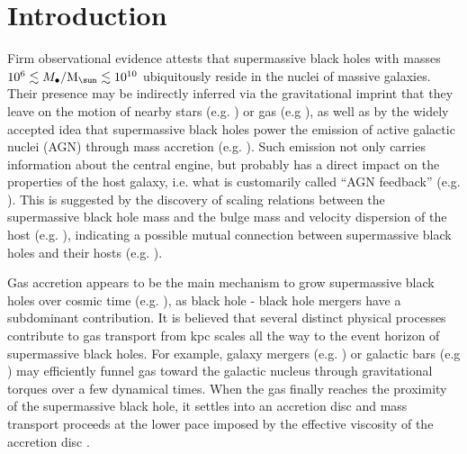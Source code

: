 \documentclass[a4paper,fleqn,usenatbib]{mnras}
\begin{document}

\section{Introduction}

Firm observational evidence attests that supermassive black holes with masses $10^{6} \lesssim M_{\bullet}/{\rm M}_{\sun} \lesssim 10^{10}$ ubiquitously reside in the nuclei of massive galaxies.
Their presence may be indirectly inferred via the gravitational imprint that they leave on the motion of nearby stars (e.g. \citealt{eckart+97,ferrarese+05,ghez+05,vandenbosch+10}) or gas (e.g \citealt{defrancesco+08,greene+10,kuo+11,vandenbosch+16}), as well as by the widely accepted idea that supermassive black holes power the emission of active galactic nuclei (AGN) through mass accretion (e.g. \citealt{lyndenbell+69,urry+95}).
Such emission not only carries information about the central engine, but probably has a direct impact on the properties of the host galaxy, i.e. what is customarily called ``AGN feedback'' (e.g. \citealt{springel+05b,sijacki+07,dubois+12,fabian+12}).
This is suggested by the discovery of scaling relations between the supermassive black hole mass and the bulge mass and velocity dispersion of the host (e.g. \citealt{ferrarese+00,tremaine+02,gultekin+09,kormendy+13,mcconnell+13}), indicating a possible mutual connection between supermassive black holes and their hosts (e.g. \citealt{silk+98,king+03,king+15,sijacki+15}).

Gas accretion appears to be the main mechanism to grow supermassive black holes over cosmic time (e.g. \citealt{soltan+82}), as black hole - black hole mergers have a subdominant contribution.
It is believed that several distinct physical processes contribute to gas transport from kpc scales all the way to the event horizon of supermassive black holes.
For example, galaxy mergers (e.g. \citealt{barnes+91,springel+05b,hopkins+06}) or galactic bars (e.g \citealt{laine+02,laurikainen+04,hopkins+10,fanali+15}) may efficiently funnel gas toward the galactic nucleus through gravitational torques over a few dynamical times. 
When the gas finally reaches the proximity of the supermassive black hole, it settles into an accretion disc and mass transport proceeds at the lower pace imposed by the effective viscosity of the accretion disc \citep{shakura+73,king+07}.
\end{document}
